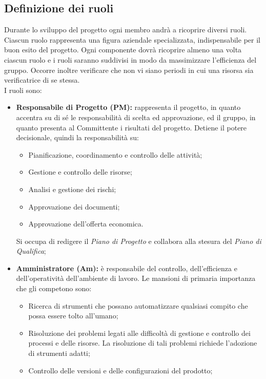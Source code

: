 	\subsection{Definizione dei ruoli}
		Durante lo sviluppo del progetto ogni membro andrà a ricoprire diversi ruoli. Ciascun ruolo rappresenta una figura aziendale specializzata, indispensabile per il buon esito del progetto. Ogni componente dovrà ricoprire almeno una volta ciascun ruolo e i ruoli saranno suddivisi in modo da massimizzare l'efficienza del gruppo. Occorre inoltre verificare che non vi siano periodi in cui una risorsa sia verificatrice di se stessa. \\
		I ruoli sono:
		\begin{itemize}
			\item \textbf{Responsabile di Progetto (PM):} rappresenta il progetto, in quanto accentra su di sé le responsabilità di scelta ed approvazione, ed il gruppo, in quanto presenta al Committente i risultati del progetto. Detiene il potere decisionale, quindi la responsabilità su: \\
			\begin{itemize}
				\item Pianificazione, coordinamento e controllo delle attività;
				\item Gestione e controllo delle risorse;
				\item Analisi e gestione dei rischi;
				\item Approvazione dei documenti;
				\item Approvazione dell'offerta economica. \\
			\end{itemize}
			Si occupa di redigere il \textit{Piano di Progetto} e collabora alla stesura del \textit{Piano di Qualifica};
			\item \textbf{Amministratore (Am):} è responsabile del controllo, dell'efficienza e dell'operatività dell'ambiente di lavoro. Le mansioni di primaria importanza che gli competono sono: \\
			\begin{itemize}
				\item Ricerca di strumenti che possano automatizzare qualsiasi compito che possa
essere tolto all'umano; \\
				\item Risoluzione dei problemi legati alle difficoltà di gestione e controllo dei processi
e delle risorse. La risoluzione di tali problemi richiede l'adozione di strumenti adatti;
				\item Controllo delle versioni e delle configurazioni del prodotto;

\end{itemize}
\end{itemize}

